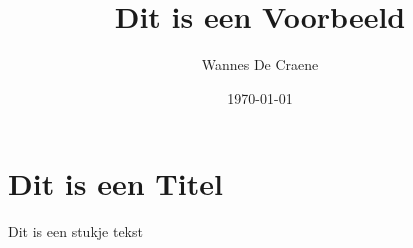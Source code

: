 \documentclass[12pt,a4paper]{article}
\author{Wannes De Craene}
\title{Dit is een Voorbeeld}
\date{\today}
\begin{document}
    \maketitle
    \section{Dit is een Titel}
    Dit is een stukje tekst
\end{document}
